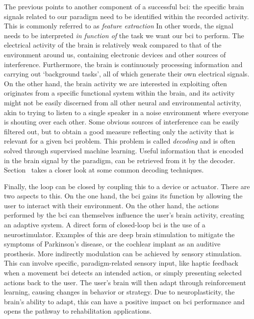 The previous points to another component of a successful \ac{bci}: the specific
brain signals related to our paradigm need to be identified within the recorded
activity.
This is commonly referred to as \emph{feature extraction}
In other words, the signal needs to be interpreted \emph{in function of} the
task we want our \ac{bci} to perform.
The electrical activity of the brain is relatively weak compared to that of the
environment around us, containing electronic devices and other sources of
interference.
Furthermore, the brain is continuously processing information and carrying out
`background tasks', all of which generate their own electrical signals.
On the other hand, the brain activity we are interested in exploiting often
originates from a specific functional system within the brain, and its activity
might not be easily discerned from all other neural and environmental activity,
akin to trying to listen to a single speaker in a noise environment where
everyone is shouting over each other.
Some obvious sources of interference can be easily filtered out, but to obtain
a good measure reflecting only the activity that is relevant for a given \ac{bci}
problem.
This problem is called \emph{decoding} and is often solved through supervised
machine learning.
Useful information that is encoded in the brain signal by the paradigm,
can be retrieved from it by the decoder.
Section~\label{sec:bci-decoding} takes a closer look at some common decoding
techniques.

Finally, the loop can be closed by coupling this to a
device or actuator.
There are two aspects to this.
On the one hand, the \ac{bci} gains its function by allowing the user to interact
with their environment.
On the other hand, the actions performed by the \ac{bci} can themselves influence
the user's brain activity, creating an adaptive system.
A direct form of closed-loop \ac{bci} is the use of a neurostimulator.
Examples of this are deep brain stimulation to mitigate the symptoms of
Parkinson's disease, or the cochlear implant as an auditive prosthesis.
More indirectly modulation can be achieved by sensory stimulation.
This can involve specific, paradigm-related sensory input, like haptic feedback when a
movement \ac{bci} detects an intended action, or simply presenting selected actions
back to the user.
The user's brain will then adapt through reinforcement learning, causing
changes in behavior or strategy.
Due to neuroplasticity, the brain's ability to adapt, this can have a positive
impact on \ac{bci} performance and opens the pathway to rehabilitation applications.

